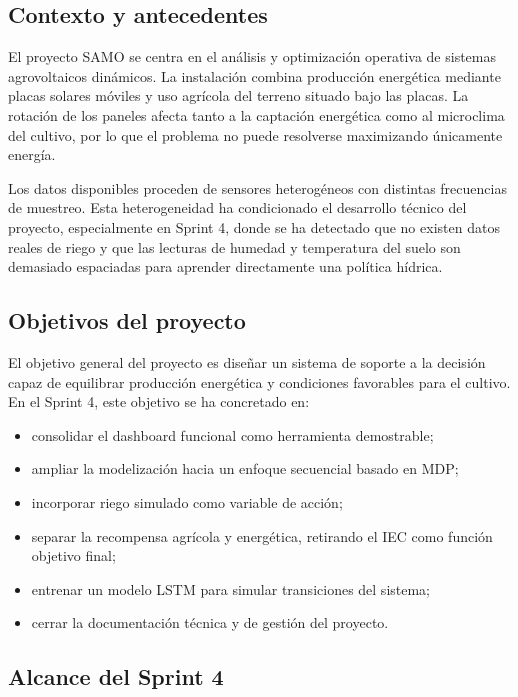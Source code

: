 \documentclass[11pt,a4paper]{article}
\begin{document}
\subsection{Contexto y antecedentes}

El proyecto SAMO se centra en el análisis y optimización operativa de sistemas agrovoltaicos dinámicos. La instalación combina producción energética mediante placas solares móviles y uso agrícola del terreno situado bajo las placas. La rotación de los paneles afecta tanto a la captación energética como al microclima del cultivo, por lo que el problema no puede resolverse maximizando únicamente energía.

Los datos disponibles proceden de sensores heterogéneos con distintas frecuencias de muestreo. Esta heterogeneidad ha condicionado el desarrollo técnico del proyecto, especialmente en Sprint 4, donde se ha detectado que no existen datos reales de riego y que las lecturas de humedad y temperatura del suelo son demasiado espaciadas para aprender directamente una política hídrica.

\subsection{Objetivos del proyecto}

El objetivo general del proyecto es diseñar un sistema de soporte a la decisión capaz de equilibrar producción energética y condiciones favorables para el cultivo. En el Sprint 4, este objetivo se ha concretado en:

\begin{itemize}
    \item consolidar el dashboard funcional como herramienta demostrable;
    \item ampliar la modelización hacia un enfoque secuencial basado en MDP;
    \item incorporar riego simulado como variable de acción;
    \item separar la recompensa agrícola y energética, retirando el IEC como función objetivo final;
    \item entrenar un modelo LSTM para simular transiciones del sistema;
    \item cerrar la documentación técnica y de gestión del proyecto.
\end{itemize}

\subsection{Alcance del Sprint 4}
\end{document}
